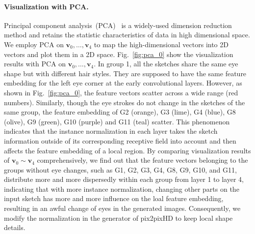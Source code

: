 \documentclass[10pt,twocolumn,letterpaper]{article}
\newcommand{\cxj}[1]{\textcolor{red}{(Cxj: #1)}}
\begin{document}

 
\paragraph{Visualization with PCA.} Principal component analysis~(PCA)~\cite{pca} is a widely-used dimension reduction method and retains the statistic characteristics of data in high dimensional space. 
We employ PCA on $\boldsymbol{v}_0,\ldots, \boldsymbol{v}_4$ to map the high-dimensional vectors into 2D vectors and plot them in a 2D space. 
Fig.~\ref{fig:pca_0} show the visualization results with PCA on $\boldsymbol{v}_0,\ldots,\boldsymbol{v}_4$. 
%
In group 1, all the sketches share the same eye shape but with different hair styles. They are supposed to have the same feature embedding for the left eye corner at the early convolutional layers. However, as shown in Fig.~\ref{fig:pca_0}, the feature vectors scatter across a wide range (red numbers). 
Similarly, though the eye strokes do not change in the sketches of the same group, the feature embedding of G2 (orange), G3 (lime), G4 (blue), G8 (olive), G9 (green), G10 (purple) and G11 (teal) scatter.
%
This phenomenon indicates that the instance normalization in each layer takes the sketch information outside of its corresponding receptive field into account and then affects the feature embedding of a local region. 
By comparing visualization results of $\boldsymbol{v}_0\sim\boldsymbol{v}_4$ comprehensively, we find out that the feature vectors belonging to the groups without eye changes, such as G1, G2, G3, G4, G8, G9, G10, and G11, distribute more and more dispersedly within each group from layer 1 to layer 4, indicating that with more instance normalization, changing other parts on the input sketch has more and more influence on the loal feature embedding, resulting in an awful change of eyes in the generated images.
Consequently, we modify the normalization in the generator of pix2pixHD to keep local shape details. 
\end{document}
